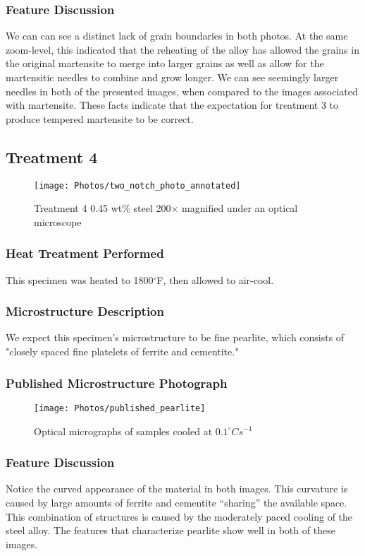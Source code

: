 \documentclass{article}
\newcommand{\degf}{$^\circ $F}
\begin{document}
\subsubsection*{Feature Discussion}
We can can see a distinct lack of grain boundaries in both photos. At the same zoom-level, this indicated that the reheating of the alloy has allowed the grains in the original martensite to merge into larger grains as well as allow for the martensitic needles to combine and grow longer. We can see seemingly larger needles in both of the presented images, when compared to the images associated with martensite. These facts indicate that the expectation for treatment 3 to produce tempered martensite to be correct.

\newpage

\subsection*{Treatment 4}
\begin{figure}[H]
\centering
\texttt{[image: Photos/two\_notch\_photo\_annotated]}
\caption{Treatment 4 0.45 wt\% steel 200$\times$ magnified under an optical microscope}
\end{figure}

\subsubsection*{Heat Treatment Performed}
This specimen was heated to 1800\degf, then allowed to air-cool.

\subsubsection*{Microstructure Description}
We expect this specimen's microstructure to be fine pearlite, which consists of "closely spaced fine platelets of ferrite and cementite." \cite{book,WU201253}

\subsubsection*{Published Microstructure Photograph}
\begin{figure}[H]
\centering
\texttt{[image: Photos/published\_pearlite]}
\caption{Optical micrographs of samples cooled at $0.1^\circ C s^{-1}$ \cite{WU201253}}
\end{figure}

\subsubsection*{Feature Discussion}
Notice the curved appearance of the material in both images. This curvature is caused by large amounts of ferrite and cementite ``sharing'' the available space. This combination of structures is caused by the moderately paced cooling of the steel alloy. The features that characterize pearlite show well in both of these images. 
\end{document}
